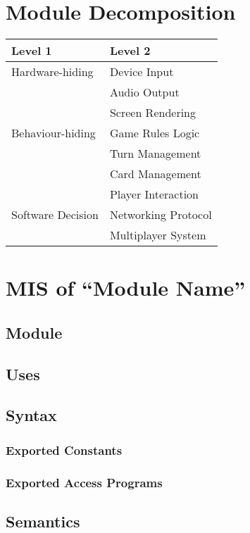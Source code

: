 \documentclass{article}
\begin{document}
\section{Module Decomposition}
\begin{longtable}{|l|l|}
\hline
\textbf{Level 1} & \textbf{Level 2} \\
\hline
Hardware-hiding & Device Input \\ 
& Audio Output \\ 
& Screen Rendering \\
\hline
Behaviour-hiding & Game Rules Logic \\ 
& Turn Management \\ 
& Card Management \\ 
& Player Interaction \\
\hline
Software Decision & Networking Protocol \\ 
& Multiplayer System \\
\hline
\end{longtable}

\section{MIS of ``Module Name''}
\subsection{Module}

\subsection{Uses}

\subsection{Syntax}
\subsubsection{Exported Constants}

\subsubsection{Exported Access Programs}

\subsection{Semantics}
\end{document}
